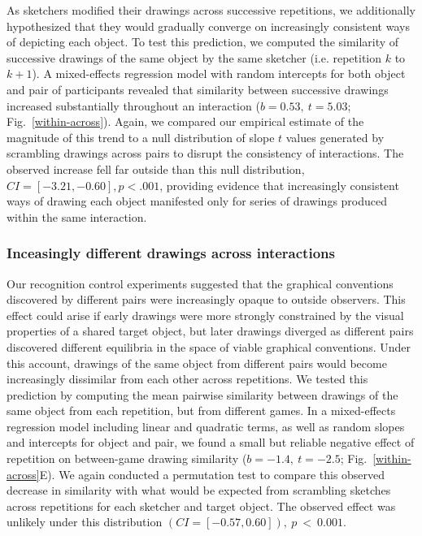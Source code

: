 \documentclass[10pt,letterpaper]{article}
\begin{document}
As sketchers modified their drawings across successive repetitions, we additionally hypothesized that they would gradually converge on increasingly consistent ways of depicting each object.
To test this prediction, we computed the similarity of successive drawings of the same object by the same sketcher (i.e. repetition $k$ to $k+1$). %
A mixed-effects regression model with random intercepts for both object and pair of participants revealed that similarity between successive drawings increased substantially throughout an interaction ($b = 0.53,~t = 5.03$; Fig.~\ref{within-across}).
Again, we compared our empirical estimate of the magnitude of this trend to a null distribution of slope $t$ values generated by scrambling drawings across pairs to disrupt the consistency of interactions.
The observed increase fell far outside than this null distribution, $CI = [-3.21, -0.60], p < .001$, providing evidence that increasingly consistent ways of drawing each object manifested only for series of drawings produced within the same interaction.

\subsubsection{Inceasingly different drawings across interactions}

Our recognition control experiments suggested that the graphical conventions discovered by different pairs were increasingly opaque to outside observers.
This effect could arise if early drawings were more strongly constrained by the visual properties of a shared target object, but later drawings diverged as different pairs discovered different equilibria in the space of viable graphical conventions.
Under this account, drawings of the same object from different pairs would become increasingly dissimilar from each other across repetitions.
We tested this prediction by computing the mean pairwise similarity between drawings of the same object from each repetition, but from different games.
In a mixed-effects regression model including linear and quadratic terms, as well as random slopes and intercepts for object and pair, we found a small but reliable negative effect of repetition on between-game drawing similarity ($b = -1.4, ~t = -2.5$; Fig.~\ref{within-across}E). %
We again conducted a permutation test to compare this observed decrease in similarity with what would be expected from scrambling sketches across repetitions for each sketcher and target object. The observed effect was unlikely under this distribution $(CI = [-0.57, 0.60]),~p~<~0.001$.
\end{document}
